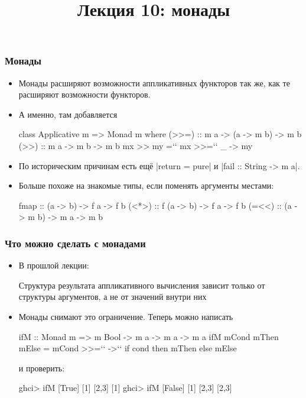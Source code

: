 \documentclass[11pt]{beamer}
\title{Лекция 10: монады}
\begin{document}
\begin{frame}[plain]
    \maketitle
\end{frame}

\begin{frame}[fragile]
\frametitle{Монады}
\begin{itemize}
    \item Монады расширяют возможности аппликативных функторов так же, как те расширяют возможности функторов.
    \item А именно, там добавляется
    \begin{haskell}
    class Applicative m => Monad m where
      (>>=) :: m a -> (a -> m b) -> m b
      (>>) :: m a -> m b -> m b
      mx >> my =`\pause` mx >>=`\pause` \_ -> my
    \end{haskell}
    \pause
    \item По историческим причинам есть ещё \haskinline|return = pure| и \haskinline|fail :: String -> m a|.
    \pause
    \item Больше похоже на знакомые типы, если поменять аргументы местами:
    \begin{haskell}
    fmap  ::   (a -> b) -> f a -> f b
    (<*>) :: f (a -> b) -> f a -> f b
    (=<<) :: (a -> m b) -> m a -> m b
    \end{haskell}
\end{itemize}
\end{frame}

\begin{frame}[fragile]
\frametitle{Что можно сделать с монадами}
\begin{itemize}
    \item В прошлой лекции: 
    \begin{displayquote}
        Структура результата аппликативного вычисления зависит только от структуры аргументов, а не от значений внутри них
    \end{displayquote}
    \item Монады снимают это ограничение. Теперь можно написать 
    \begin{haskell}
    ifM :: Monad m => m Bool -> m a -> m a -> m a
    ifM mCond mThen mElse = mCond >>=`\pause` \cond ->`\pause` 
      if cond then mThen else mElse
    \end{haskell}
    и проверить:
    \begin{haskell}
    ghci> ifM [True] [1] [2,3]
    [1]
    ghci> ifM [False] [1] [2,3]
    [2,3]
    \end{haskell}
\end{itemize}
\end{frame}
\end{document}
